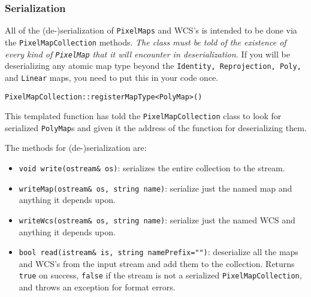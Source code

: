 \documentclass[11pt,preprint,flushrt]{aastex}
\begin{document}
\subsubsection{Serialization}
All of the (de-)serialization of {\tt PixelMaps} and WCS's is intended to be done via the {\tt PixelMapCollection} methods.  {\em The class must be told of the existence of every kind of {\tt PixelMap} that it will encounter in deserialization.}  If you will be deserializing any atomic map type beyond the {\tt Identity, Reprojection, Poly,} and {\tt Linear} maps, you need to put this in your code once.
\begin{verbatim}
PixelMapCollection::registerMapType<PolyMap>()
\end{verbatim}
This templated function has told the {\tt PixelMapCollection} class to look for serialized {\tt PolyMap}s and given it the address of the function for deserializing them.

The methods for (de-)serialization are:
\begin{itemize}
\item {\tt void write(ostream\& os)}: serializes the entire collection to the stream.
\item {\tt writeMap(ostream\& os, string name)}: serialize just the named map and anything it depends upon.
\item {\tt writeWcs(ostream\& os, string name)}: serialize just the named WCS and anything it depends upon.
\item {\tt bool read(istream\& is, string namePrefix="")}: deserialize all the maps and WCS's from the input stream and add them to the collection.  Returns {\tt true} on success, {\tt false} if the stream is not a serialized {\tt PixelMapCollection}, and throws an exception for format errors.
\end{itemize}
\end{document}
